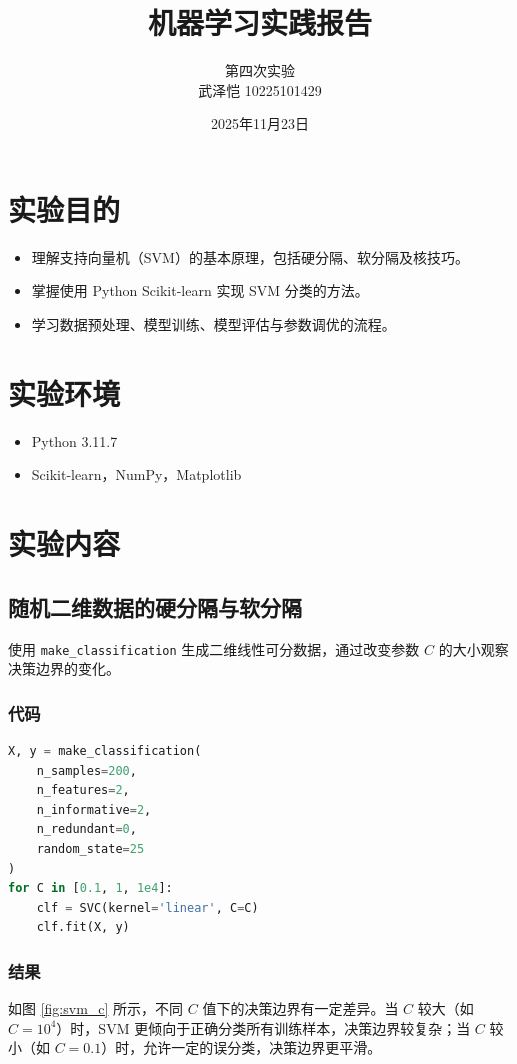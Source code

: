 \documentclass{article}
\title{\heiti\textbf{机器学习实践报告}}
\author{第四次实验 \\ 
武泽恺 10225101429
}
\date{2025年11月23日}
\begin{document}
\maketitle

\section{实验目的}
\begin{itemize}
    \item 理解支持向量机（SVM）的基本原理，包括硬分隔、软分隔及核技巧。
    \item 掌握使用 Python Scikit-learn 实现 SVM 分类的方法。
    \item 学习数据预处理、模型训练、模型评估与参数调优的流程。
\end{itemize}

\section{实验环境}
\begin{itemize}
    \item Python 3.11.7
    \item Scikit-learn，NumPy，Matplotlib
\end{itemize}

\section{实验内容}

\subsection{随机二维数据的硬分隔与软分隔}
使用 \texttt{make\_classification} 生成二维线性可分数据，通过改变参数 $C$ 的大小观察决策边界的变化。

\subsubsection{代码}
\begin{lstlisting}[language=python]
X, y = make_classification(
    n_samples=200,
    n_features=2,
    n_informative=2,
    n_redundant=0,
    random_state=25
)
for C in [0.1, 1, 1e4]:
    clf = SVC(kernel='linear', C=C)
    clf.fit(X, y)
\end{lstlisting}

\subsubsection{结果}
如图 \ref{fig:svm_c} 所示，不同 $C$ 值下的决策边界有一定差异。当 $C$ 较大（如 $C=10^4$）时，SVM 更倾向于正确分类所有训练样本，决策边界较复杂；当 $C$ 较小（如 $C=0.1$）时，允许一定的误分类，决策边界更平滑。
\end{document}
